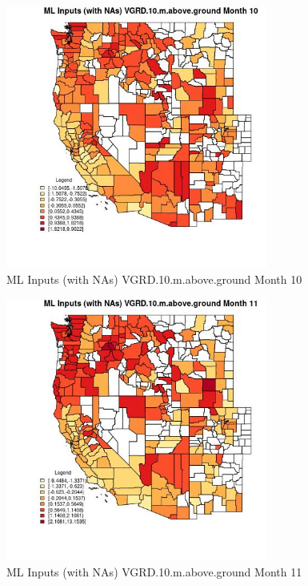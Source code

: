 \begin{figure} 
\centering  
\includegraphics[width=0.77\textwidth]{Code_Outputs/Report_ML_input_PM25_Step4_part_f_de_duplicated_aves_prioritize_24hr_obswNAs_CountyVGRD10mabovegroundmedianMonth10.jpg} 
\caption{\label{fig:Report_ML_input_PM25_Step4_part_f_de_duplicated_aves_prioritize_24hr_obswNAsCountyVGRD10mabovegroundmedianMonth10}ML Inputs (with NAs) VGRD.10.m.above.ground Month 10} 
\end{figure} 
 

\clearpage 

\begin{figure} 
\centering  
\includegraphics[width=0.77\textwidth]{Code_Outputs/Report_ML_input_PM25_Step4_part_f_de_duplicated_aves_prioritize_24hr_obswNAs_CountyVGRD10mabovegroundmedianMonth11.jpg} 
\caption{\label{fig:Report_ML_input_PM25_Step4_part_f_de_duplicated_aves_prioritize_24hr_obswNAsCountyVGRD10mabovegroundmedianMonth11}ML Inputs (with NAs) VGRD.10.m.above.ground Month 11} 
\end{figure} 
 

